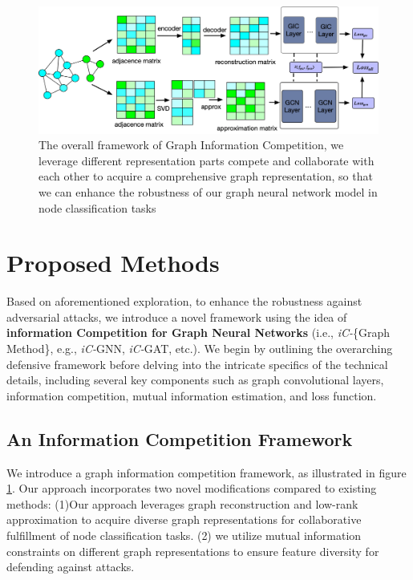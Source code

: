 \documentclass[conference]{IEEEtran}
\begin{document}
\begin{figure}
  \centering
  \includegraphics[width=.9\textwidth]{frame1.jpg} %
  \caption{The overall framework of Graph Information Competition, we leverage different representation parts compete and collaborate with each other to acquire a comprehensive graph representation, so that we can enhance the robustness of our graph neural network model in node classification tasks} %
  \label{frame} %
\end{figure}

\section{Proposed Methods}

Based on aforementioned exploration, to enhance the robustness against adversarial attacks, we introduce a novel framework using the idea of \textbf{information Competition for Graph Neural Networks} (i.e., \textit{iC-}\{Graph Method\}, e.g., \textit{iC-}GNN, \textit{iC-}GAT, etc.). We begin by outlining the overarching defensive framework before delving into the intricate specifics of the technical details, including several key components such as graph convolutional layers, information competition, mutual information estimation, and loss function.

\subsection{An Information Competition Framework}

We introduce a graph information competition framework, as illustrated in figure \ref{frame}. Our approach incorporates two novel modifications compared to existing methods: (1)Our approach leverages graph reconstruction and low-rank approximation to acquire diverse graph representations for collaborative fulfillment of node classification tasks. (2) we utilize mutual information constraints on different graph representations to ensure feature diversity for defending against attacks. 
\end{document}
